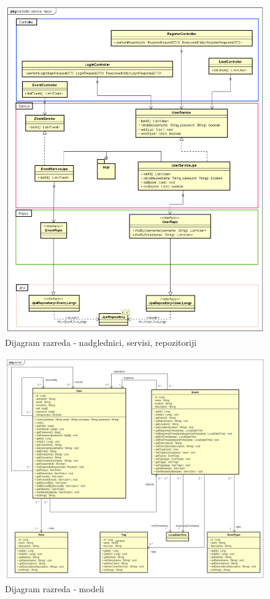			\begin{figure}[h]
				\begin{center}
					\includegraphics[width=\textwidth]{dijagrami/UML kontroleri, servisi, repozitoriji.png}
					\caption{Dijagram razreda - nadglednici, servisi, repozitoriji}
				\end{center}	
			\end{figure}
		
			\begin{figure}[h]
				\begin{center}
					\includegraphics[width=\textwidth]{dijagrami/UML modeli.png}
					\caption{Dijagram razreda - modeli}
				\end{center}	
			\end{figure}
		
